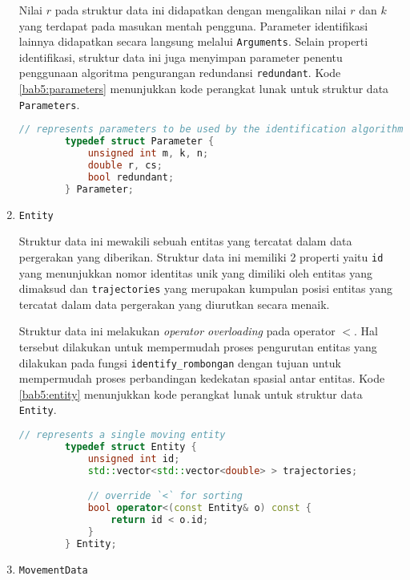 \begin{enumerate}
    Nilai $r$ pada struktur data ini didapatkan dengan mengalikan nilai $r$ dan $k$ yang terdapat pada masukan mentah pengguna. Parameter identifikasi lainnya didapatkan secara langsung melalui \texttt{Arguments}. Selain properti identifikasi, struktur data ini juga menyimpan parameter penentu penggunaan algoritma pengurangan redundansi \texttt{redundant}. Kode \ref{bab5:parameters} menunjukkan kode perangkat lunak untuk struktur data \texttt{Parameters}.
    
    \begin{lstlisting}[language=C++, caption=Implementasi \texttt{Parameters}, label={bab5:parameters}]
        // represents parameters to be used by the identification algorithm
        typedef struct Parameter {
            unsigned int m, k, n;
            double r, cs;
            bool redundant;
        } Parameter;
    \end{lstlisting}
    
    \item \texttt{Entity}
    
    Struktur data ini mewakili sebuah entitas yang tercatat dalam data pergerakan yang diberikan. Struktur data ini memiliki 2 properti yaitu \texttt{id} yang menunjukkan nomor identitas unik yang dimiliki oleh entitas yang dimaksud dan \texttt{trajectories} yang merupakan kumpulan posisi entitas yang tercatat dalam data pergerakan yang diurutkan secara menaik.
    
    Struktur data ini melakukan \textit{operator overloading} pada operator $<$. Hal tersebut dilakukan untuk mempermudah proses pengurutan entitas yang dilakukan pada fungsi \texttt{identify\_rombongan} dengan tujuan untuk mempermudah proses perbandingan kedekatan spasial antar entitas. Kode \ref{bab5:entity} menunjukkan kode perangkat lunak untuk struktur data \texttt{Entity}.
    
    \begin{lstlisting}[language=C++, caption=Implementasi \texttt{Entity}, label={bab5:entity}]
        // represents a single moving entity
        typedef struct Entity {
            unsigned int id;
            std::vector<std::vector<double> > trajectories;

            // override `<` for sorting
            bool operator<(const Entity& o) const {
                return id < o.id;
            }
        } Entity;
    \end{lstlisting}
    
    \item \texttt{MovementData}
    

\end{enumerate}
